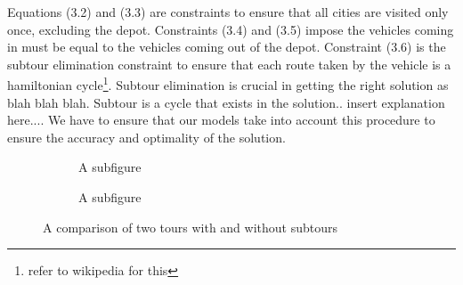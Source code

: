 \vspace{1cm}

Equations (3.2) and (3.3) are constraints to ensure that all cities are visited only once, excluding the depot. Constraints (3.4) and (3.5)
impose the vehicles coming in must be equal to the vehicles coming out of the depot. Constraint (3.6) is the subtour
elimination constraint to ensure that each route taken by the vehicle is a hamiltonian cycle\footnote{refer to wikipedia for this}. Subtour elimination
is crucial in getting the right solution as blah blah blah. Subtour is a cycle that exists in the solution.. insert explanation here.... We
have to ensure that our models take into account this procedure to ensure the accuracy and optimality of the solution.
\vspace{0.5cm}
\begin{figure}[!ht]
  \centering
    \begin{subfigure}{.5\textwidth}
      \centering

      \caption{A subfigure}
      \label{fig:sub1}
    \end{subfigure}%
    \begin{subfigure}{.5\textwidth}
      \centering
      \caption{A subfigure}
      \label{fig:sub2}
    \end{subfigure}
    \caption{A comparison of two tours with and without subtours}
    \label{fig:test}
\end{figure}

